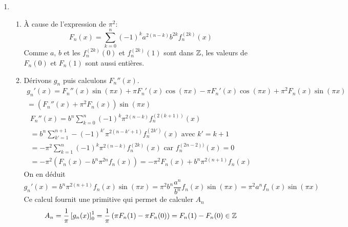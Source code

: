 \begin{enumerate}
 \item
\begin{enumerate}
 \item \`A cause de l'expression de $\pi^2$:
\begin{displaymath}
 F_n(x)=\sum_{k=0}^n(-1)^ka^{2(n-k)}b^{2k}f_n^{(2k)}(x)
\end{displaymath}
Comme $a$, $b$ et les $f_n^{(2k)}(0)$ et $f_n^{(2k)}(1)$ sont dans $\mathbb{Z}$, les valeurs de $F_n(0)$ et $F_n(1)$ sont aussi entières. 
 \item Dérivons $g_n$ puis calculons $F_n''(x)$.
\begin{multline*}
 g_n'(x)=F_n''(x)\sin(\pi x)+\pi F_n'(x)\cos(\pi x)-\pi F_n'(x)\cos(\pi x) + \pi^2 F_n(x)\sin(\pi x)\\
= \left(F_n''(x) +\pi^2 F_n(x) \right)\sin(\pi x)
\end{multline*}
\begin{multline*}
 F_n''(x)=
b^n\sum_{k=0}^{n}(-1)^k\pi^{2(n-k)}f_n^{(2(k+1))}(x)\\
= b^n\sum_{k'=1}^{n+1}-(-1)^{k'}\pi^{2(n-k'+1)}f_n^{(2k')}(x)\text{ avec } k'=k+1\\
=-\pi^2 \sum_{k=1}^{n}(-1)^k\pi^{2(n-k)}f_n^{(2k)}(x)  \text{ car } f_n^{(2n-2))}(x)=0\\
=-\pi^2\left(  F_n(x)-b^n\pi^{2n}f_n(x) \right) 
=-\pi^2 F_n(x)+ b^n\pi^{2(n+1)}f_n(x)
\end{multline*}
On en déduit
\begin{displaymath}
 g_n'(x)= b^n\pi^{2(n+1)}f_n(x)\sin(\pi x)=\pi^2 b^n\frac{a^n}{b^n}f_n(x)\sin(\pi x)= \pi^2 a^nf_n(x)\sin(\pi x)
\end{displaymath}
Ce calcul fournit une primitive qui permet de calculer $A_n$
\begin{displaymath}
 A_n=\frac{1}{\pi}\left[ g_n(x)\right]_0^1 =\frac{1}{\pi}\left(\pi F_n(1)-\pi F_n(0) \right)= F_n(1)- F_n(0)\in \mathbb{Z}
\end{displaymath}
\end{enumerate}


\end{enumerate}
